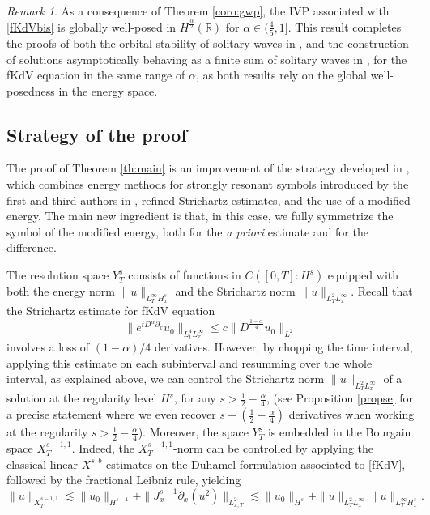 \documentclass{amsart}
\theoremstyle{definition}
\theoremstyle{remark}
\newtheorem{remark}[theorem]{Remark}
\numberwithin{equation}{section}
\begin{document}
\begin{remark} As a consequence of Theorem \ref{coro:gwp}, the IVP associated with \eqref{fKdVbis} is globally well-posed in $H^{\frac{\alpha}{2}}(\mathbb R)$ for $\alpha \in (\frac{4}{5}, 1]$. This result completes the proofs of both the orbital stability of solitary waves in \cite{LiPiSa15,Ar16}, and the construction of solutions asymptotically behaving as a finite sum of solitary waves in \cite{Ey23}, for the fKdV equation in the same range of $\alpha$, as both results rely on the global well-posedness in the energy space.
\end{remark}

\subsection{Strategy of the proof} 

The proof of Theorem \ref{th:main} is an improvement of the strategy developed in \cite{MPV}, which combines energy methods for strongly resonant symbols introduced by the first and third authors in \cite{MV}, refined Strichartz estimates, and the use of a modified energy. The main new ingredient is that, in this case, we fully symmetrize  the symbol of the modified energy, both for the \emph{a priori} estimate and for the difference. 

The resolution space $Y^s_T$  consists of functions in $C([0,T] : H^s)$ equipped with both the energy norm $\| u\|_{L^\infty_TH^s_x}$ and the Strichartz norm $\| u\|_{L^2_TL^{\infty}_x}$. Recall that the Strichartz estimate for fKdV equation 
\[ \|e^{tD^{\alpha}\partial_x}u_0\|_{L^4_tL^{\infty}_x} \le c \|D^{\frac{1-\alpha}4}u_0\|_{L^2} \] 
involves a loss of $(1-\alpha)/4$ derivatives. However, by chopping the time interval, applying this estimate on each subinterval and resumming over the whole interval,  as explained above, we can control the Strichartz norm $\| u\|_{L^2_TL^{\infty}_x}$ of a solution at the regularity level $H^s$, for any $s>\frac12-\frac{\alpha}4$, (see Proposition \ref{propse} for a precise statement where we even recover $s-(\frac12-\frac{\alpha}4)$ derivatives when working at the regularity $s>\frac12-\frac{\alpha}4$). 
Moreover, the space $Y^s_T$ is embedded in the Bourgain space $X^{s-1,1}_T$. Indeed, the $X^{s-1,1}_T$-norm can be controlled by applying the classical linear $X^{s,b}$ estimates on the Duhamel formulation associated to \eqref{fKdV}, followed by the fractional Leibniz rule, yielding
  \[\|u\|_{X^{s-1,1}_T} \lesssim \|u_0\|_{H^{s-1}} +\|J_x^{s-1}\partial_x(u^2)\|_{L^2_{x,T}} \lesssim \|u_0\|_{H^s}+\|u\|_{L^2_TL^{\infty}_x}\|u\|_{L^{\infty}_TH^s_x} .\]
\end{document}
